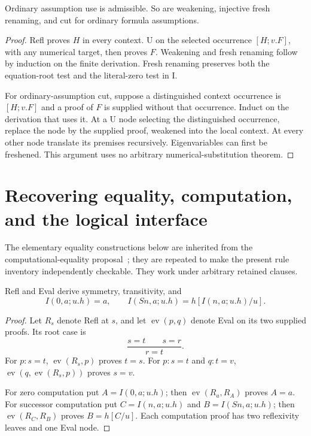 \begin{lemma}
Ordinary assumption use is admissible. So are weakening, injective fresh
renaming, and cut for ordinary formula assumptions.
\end{lemma}
\begin{proof}
Refl proves $H$ in every context. U on the selected occurrence
$[H;v.F]$, with any numerical target, then proves $F$.
Weakening and fresh renaming follow by induction on the finite
derivation. Fresh renaming preserves both the equation-root test and
the literal-zero test in I.

For ordinary-assumption cut, suppose a distinguished context occurrence
is $[H;v.F]$ and a proof of $F$ is supplied without that occurrence.
Induct on the derivation that uses it. At a U node selecting the
distinguished occurrence, replace the node by the supplied proof,
weakened into the local context. At every other node translate its
premises recursively. Eigenvariables can first be freshened.
This argument uses no arbitrary numerical-substitution theorem.
\end{proof}

\section{Recovering equality, computation, and the logical interface}
\label{sec:ce5-recovery}

The elementary equality constructions below are inherited from the
computational-equality proposal~\cite{computational}; they are repeated to make the present
rule inventory independently checkable. They work under arbitrary
retained clauses.

\begin{lemma}
Refl and Eval derive symmetry, transitivity, and
\[
 I(0,a;u.h)=a,\qquad
 I(Sn,a;u.h)=h[I(n,a;u.h)/u].
\]
\end{lemma}
\begin{proof}
Let $R_s$ denote Refl at $s$, and let $\operatorname{ev}(p,q)$ denote
Eval on its two supplied proofs. Its root case is
\[
 \frac{s=t\qquad s=r}{r=t}.
\]
For $p:s=t$, $\operatorname{ev}(R_s,p)$ proves $t=s$.
For $p:s=t$ and $q:t=v$,
$\operatorname{ev}(q,\operatorname{ev}(R_s,p))$ proves $s=v$.

For zero computation put $A=I(0,a;u.h)$; then
$\operatorname{ev}(R_a,R_A)$ proves $A=a$.
For successor computation put $C=I(n,a;u.h)$ and
$B=I(Sn,a;u.h)$; then
$\operatorname{ev}(R_C,R_B)$ proves $B=h[C/u]$.
Each computation proof has two reflexivity leaves and one Eval node.
\end{proof}

